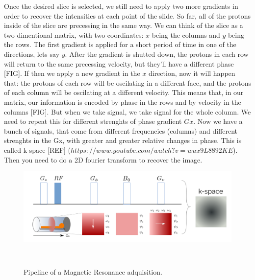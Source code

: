 Once the desired slice is selected, we still need to apply two more gradients in order to recover the intensities at each point of the slide.
So far, all of the protons inside of the slice are precessing in the same way.
We can think of the slice as a two dimentional matrix, with two coordinates: $x$ being the columns and $y$ being the rows.
The first gradient is applied for a short period of time in one of the directions, lets say $y$.
After the gradient is shutted down, the protons in each row will return to the same precessing velocity, but they'll have a different phase [FIG].
If then we apply a new gradient in the $x$ direction, now it will happen that:
the protons of each row will be oscilating in a different face,
and the protons of each column will be oscilating at a different velocity.
This means that, in our matrix, our information is encoded by phase in the rows and by velocity in the columns [FIG].
But when we take signal, we take signal for the whole column.
We need to repeat this for different strenghts of phase gradient $Gx$.
Now we have a bunch of signals, that come from different frequencies (columns) and different strenghts in the Gx, with greater and greater relative changes in phase.
This is called k-space [REF] ($https://www.youtube.com/watch?v=wux9L8892KE$).
Then you need to do a 2D fourier transform to recover the image.

\begin{figure}[h!]
                                                                                                                        
\begin{minipage}[b]{\textwidth}
    \includegraphics[width=\textwidth]{3.mri/img/kspace.png}
    \caption{Pipeline of a Magnetic Resonance adquisition.}
    \label{fig:kspace}
\end{minipage} ~

\end{figure}


